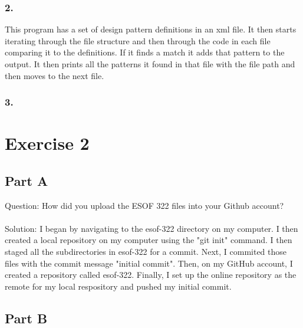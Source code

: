 \documentclass{article}
\begin{document}
\subsubsection*{2.}
This program has a set of design pattern definitions in an xml file. It then starts iterating through the file structure and then through the code in each file comparing it to the definitions. If it finds a match it adds that pattern to the output. It then prints all the patterns it found in that file with the file path and then moves to the next file. 
\subsubsection*{3.}

\newpage

\section*{Exercise 2}

\subsection*{Part A}

Question: How did you upload the ESOF 322 files into your Github account? \\\\
Solution: I began by navigating to the esof-322 directory on my computer. I then created a local repository on my computer using the "git init" command. 
I then staged all the subdirectories in esof-322 for a commit. Next, I commited those files with the commit message "initial commit".
Then, on my GitHub account, I created a repository called esof-322.
Finally, I set up the online repository as the remote for my local respository and pushed my initial commit.

\subsection*{Part B}
\end{document}
